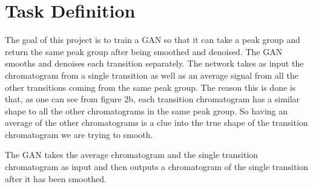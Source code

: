 \documentclass[12pt]{article}
\begin{document}
{\section{Task Definition}
The goal of this project is to train a GAN so that it can take a peak group and return the same peak group after being smoothed and denoised.  
The GAN smooths and denoises each transition separately. The network takes as input the chromatogram from a single transition as well as an average signal from all the other transitions coming from the same peak group.  The reason this is done is that, as one can see from figure 2b, each transition chromatogram has a similar shape to all the other chromatograms in the same peak group. So having an average of the other chromatograms is a clue into the true shape of the transition chromatogram we are trying to smooth. 

The GAN takes the average chromatogram and the single transition chromatogram as input and then outputs a chromatogram of the single transition after it has been smoothed. 

}
\end{document}
